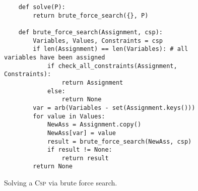 \begin{figure}[!ht]
\centering
\begin{verbatim}
    def solve(P):
        return brute_force_search({}, P)

    def brute_force_search(Assignment, csp):
        Variables, Values, Constraints = csp
        if len(Assignment) == len(Variables): # all variables have been assigned
            if check_all_constraints(Assignment, Constraints):
                return Assignment
            else:
                return None
        var = arb(Variables - set(Assignment.keys()))
        for value in Values:
            NewAss = Assignment.copy()
            NewAss[var] = value
            result = brute_force_search(NewAss, csp)
            if result != None:
                return result
        return None
\end{verbatim}
\vspace*{-0.3cm}
\caption{Solving a \textsc{Csp} via brute force search.}
\label{fig:Brute-Force-Solver.ipynb}
\end{figure}

